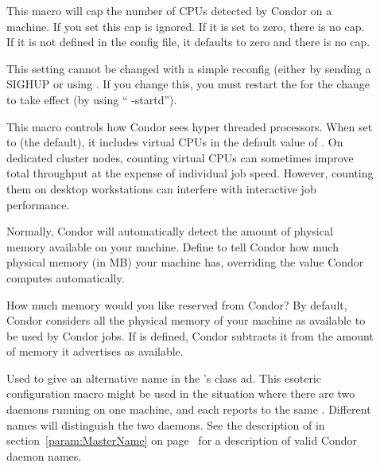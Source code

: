 \begin{description}
\item[] \label{param:MaxNumCpus}
  This macro will cap the number of CPUs detected by Condor on a machine.
  If you set  this cap is ignored.
  If it is set to zero, there is no cap. 
  If it is not defined in the config file, it defaults to zero and there is
  no cap. 

  \Note This setting cannot be changed with a simple reconfig (either
  by sending a SIGHUP or using .
  If you change this, you must restart the  for the
  change to take effect (by using `` -startd'').

\item[] \label{param:CountHyperthreadCpus}
  This macro controls how Condor sees hyper threaded
  processors. When set to  (the default), it includes virtual CPUs in
  the default value of . On dedicated cluster nodes, 
  counting virtual CPUs can sometimes improve total throughput at the expense 
  of individual job speed. However, counting them on desktop workstations can
  interfere with interactive job performance.

\item[] \label{param:Memory}
  Normally, Condor will automatically detect the amount of physical
  memory available on your machine.  Define  to tell
  Condor how much physical memory (in MB) your machine has, overriding
  the value Condor computes automatically.

\item[] \label{param:ReservedMemory}
  How much memory would you like reserved from Condor?  By default,
  Condor considers all the physical memory of your machine as
  available to be used by Condor jobs.  If  is
  defined, Condor subtracts it from the amount of memory it advertises
  as available.

\item[] \label{param:StartdName}
  Used to give an alternative name in the 's
  class ad.
  This esoteric configuration macro might be used in the situation
  where there are two  daemons running on one machine,
  and each reports to the same .
  Different names will distinguish the two daemons.
  See the description of  in
  section~\ref{param:MasterName} on page~\pageref{param:MasterName}
  for a description of valid Condor daemon names.


\end{description}

